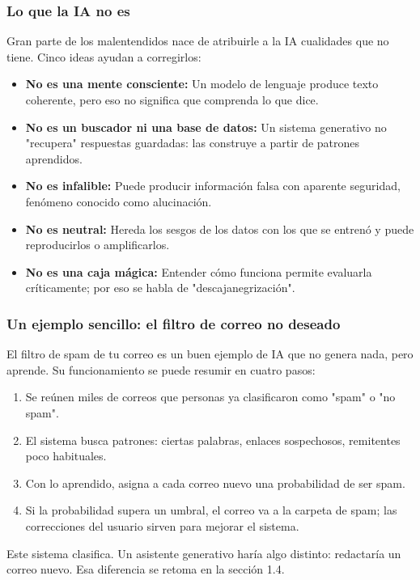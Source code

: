 \subsubsection{Lo que la IA no es}
Gran parte de los malentendidos nace de atribuirle a la IA cualidades que no tiene. Cinco ideas ayudan a corregirlos:
\begin{itemize}
    \item \textbf{No es una mente consciente:} Un modelo de lenguaje produce texto coherente, pero eso no significa que comprenda lo que dice.
    \item \textbf{No es un buscador ni una base de datos:} Un sistema generativo no "recupera" respuestas guardadas: las construye a partir de patrones aprendidos.
    \item \textbf{No es infalible:} Puede producir información falsa con aparente seguridad, fenómeno conocido como alucinación.
    \item \textbf{No es neutral:} Hereda los sesgos de los datos con los que se entrenó y puede reproducirlos o amplificarlos.
    \item \textbf{No es una caja mágica:} Entender cómo funciona permite evaluarla críticamente; por eso se habla de "descajanegrización".
\end{itemize}

\subsubsection{Un ejemplo sencillo: el filtro de correo no deseado}
El filtro de spam de tu correo es un buen ejemplo de IA que no genera nada, pero aprende. Su funcionamiento se puede resumir en cuatro pasos:
\begin{enumerate}
    \item Se reúnen miles de correos que personas ya clasificaron como "spam" o "no spam".
    \item El sistema busca patrones: ciertas palabras, enlaces sospechosos, remitentes poco habituales.
    \item Con lo aprendido, asigna a cada correo nuevo una probabilidad de ser spam.
    \item Si la probabilidad supera un umbral, el correo va a la carpeta de spam; las correcciones del usuario sirven para mejorar el sistema.
\end{enumerate}

Este sistema clasifica. Un asistente generativo haría algo distinto: redactaría un correo nuevo. Esa diferencia se retoma en la sección 1.4.

